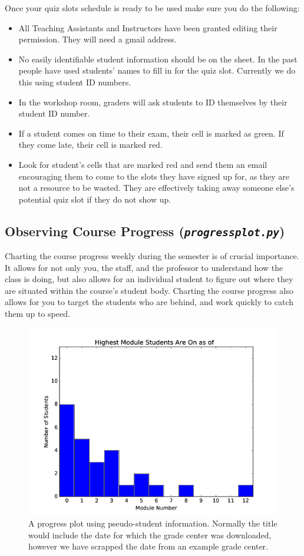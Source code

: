 \documentclass[12pt]{article}
\begin{document}
\indent Once your quiz slots schedule is ready to be used make sure you do the following:

\begin{itemize}
	\item All Teaching Assistants and Instructors have been granted editing their permission. They will need a gmail address.
	\item No easily identifiable student information should be on the sheet. In the past people have used students' names to fill in for the quiz slot. Currently we do this using student ID numbers.
	\item In the workshop room, graders will ask students to ID themselves by their student ID number.
	\item If a student comes on time to their exam, their cell is marked as green. If they come late, their cell is marked red.
	\item Look for student's cells that are marked red and send them an email encouraging them to come to the slots they have signed up for, as they are not a resource to be wasted. They are effectively taking away someone else's potential quiz slot if they do not show up.	
\end{itemize}

\subsection{Observing Course Progress (\texttt{\emph{progressplot.py}})} \label{sec:ocp}

\indent Charting the course progress weekly during the semester is of crucial importance. It allows for not only you, the staff, and the professor to understand how the class is doing, but also allows for an individual student to figure out where they are situated within the course's student body. Charting the course progress also allows for you to target the students who are behind, and work quickly to catch them up to speed. 

\begin{figure}[h]
  \centering
      \includegraphics[width=.8\textwidth]{Figures/PHY122P-ProgressPlot.png}
  \caption{\protect\label{fig:progplot} A progress plot using pseudo-student information. Normally the title would include the date for which the grade center was downloaded, however we have scrapped the date from an example grade center.}
\end{figure}
\end{document}
